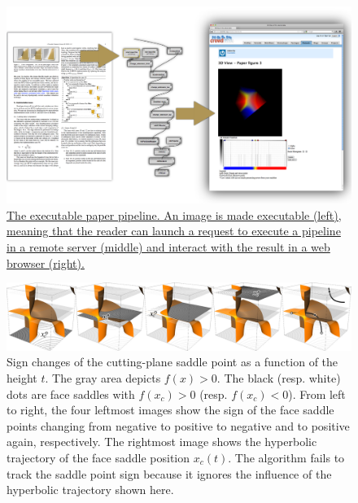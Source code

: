 \begin{figure}
     \centering
    \includegraphics[width=0.98\linewidth]{chapter4/figures/executable.png}
     \caption{ \label{fig:executable}\href{http://dl.dropbox.com/u/8414964/C-MC33/webpage/index.html}{The executable paper pipeline. An image is made executable (left), meaning that the reader can launch a request to execute a pipeline in a remote server (middle) and interact with the result in a web browser (right).  
     }}
     
\end{figure}

\begin{figure}
     \centering
     \includegraphics[width=0.99\linewidth]{chapter4/figures/case13/case13.png}
     \caption{Sign changes of the cutting-plane saddle point as a function of the height $t$. The gray area depicts $f(x) > 0$. The black (resp. white) dots are face saddles with $f(x_c) > 0$ (resp. $f(x_c) < 0$). From left to right, the four leftmost images show the sign of the face saddle points changing from negative to positive to negative and to positive again, respectively. The rightmost image shows the  hyperbolic trajectory of the face saddle position $x_c(t)$. The \mc{} algorithm fails to track the saddle point sign because it ignores the influence of the hyperbolic trajectory shown here. }
     \label{fig:case13saddlesigns}
\end{figure}

